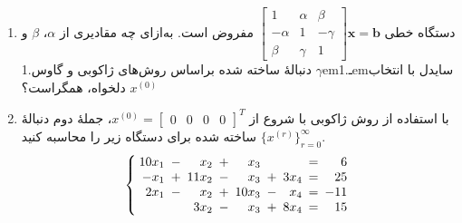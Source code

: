 \begin{enumerate}
	\item 
	دستگاه خطی 
	\(  \begin{bmatrix}
		1 & \alpha & \beta \\ -\alpha & 1 & -\gamma \\ \beta & \gamma & 1
	\end{bmatrix} \textbf{x}  = \textbf{b}\)
مفروض است. به‌ازای چه مقادیری از 
\(\alpha\)، \(\beta\) و \(\gamma\)
دنبالهٔ ساخته شده براساس روش‌های ژاکوبی و گاوس{\kern.1em}ـ‌{\kern.1em}سایدل با انتخاب 
\(x^{(0)}\)
دلخواه، همگراست؟
	\item
	با استفاده از روش ژاکوبی با شروع از 
	\(x^{(0)} =\begin{bmatrix}
		0& 0&0&0
	\end{bmatrix}^T\)،
جملهٔ دوم دنبالهٔ
\(\{x^{(r)}\}_{r=0}^\infty\)
ساخته شده  برای دستگاه زیر را محاسبه کنید.
\[  \arraycolsep=.5\arraycolsep
	\left\{\begin{array}{rcrcrcrcr}
		10x_1 & - & x_2  & + & x_3 && & = & 6\\
		-x_1 & + & 11x_2  & - & x_3 &+& 3x_4& = & 25\\
	 2x_1 & - & x_2  & + & 10x_3 &-& x_4& = & -11\\
	  &  & 3x_2  & - & x_3 &+& 8x_4& = & 15
	\end{array}\right.
\]

\end{enumerate}

